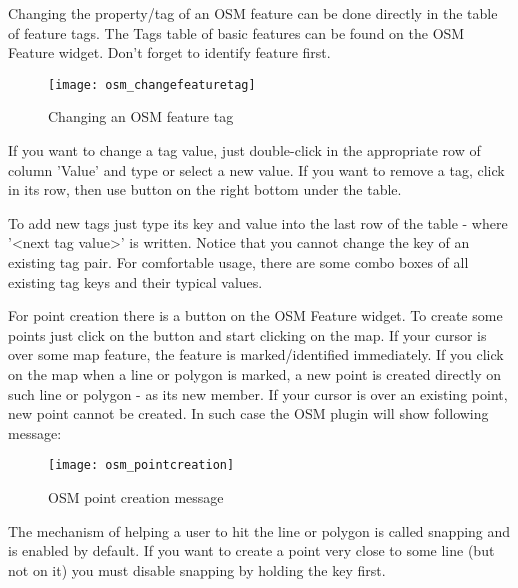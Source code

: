 
Changing the property/tag of an OSM feature can be done directly in 
the table of feature tags. The Tags table of basic features can be found 
on the OSM Feature widget. Don't forget to identify feature first.

\begin{figure}[ht]
   \begin{center}
   \caption{Changing an OSM feature tag \nixcaption}\label{fig:osmchfeattag}\smallskip
   \texttt{[image: osm\_changefeaturetag]}
\end{center}
\end{figure}

If you want to change a tag value, just double-click in the appropriate row of
column 'Value' and type or select a new value. If you want to remove a tag, 
click in its row, then use button  on the right 
bottom under the table.

To add new tags just type its key and value into the last row of the table -
where '<next tag value>' is written. Notice that you cannot change the key of 
an existing tag pair. For comfortable usage, there are some combo boxes of all
existing tag keys and their typical values.


For point creation there is a  
button on the OSM Feature widget. To create some points just click on the 
button and start clicking on the map. If your cursor is over some map 
feature, the feature is marked/identified immediately. If you click on 
the map when a line or polygon is marked, a new point is created directly on 
such line or polygon - as its new member. If your cursor is over an existing 
point, new point cannot be created. In such case the OSM plugin will show
following message:

\begin{figure}[ht]
   \begin{center}
   \caption{OSM point creation message \nixcaption}\label{fig:osmpoicreat}\smallskip
   \texttt{[image: osm\_pointcreation]}
\end{center}
\end{figure}

The mechanism of helping a user to hit the line or polygon is called snapping
and is enabled by default. If you want to create a point very close to some
line (but not on it) you must disable snapping by holding the
 key first.

